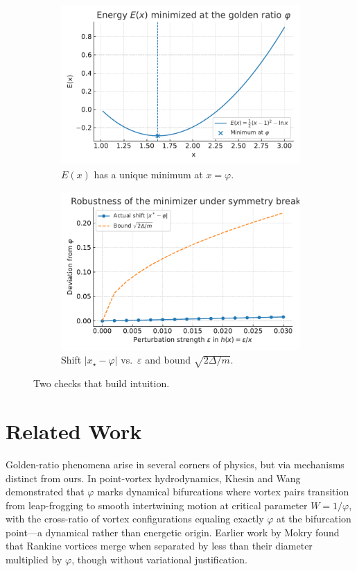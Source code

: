 \documentclass[11pt]{article}
\theoremstyle{remark}
\theoremstyle{definition}
\newcommand{\ph}{\varphi}
\newcommand{\eps}{\varepsilon}
\begin{document}
\begin{figure}[t]
  \centering
  \begin{subfigure}{0.48\linewidth}
    \centering
    \includegraphics[width=\linewidth]{E_of_x_min_at_phi.pdf}
    \caption{$E(x)$ has a unique minimum at $x=\ph$.}
  \end{subfigure}\hfill
  \begin{subfigure}{0.48\linewidth}
    \centering
    \includegraphics[width=\linewidth]{robustness_shift_vs_epsilon.pdf}
    \caption{Shift $|x_\star-\ph|$ vs.\ $\eps$ and bound $\sqrt{2\Delta/m}$.}
  \end{subfigure}
  \caption{Two checks that build intuition.}
\end{figure}

\FloatBarrier

\section{Related Work}
Golden-ratio phenomena arise in several corners of physics, but via mechanisms distinct from ours. In point-vortex hydrodynamics, Khesin and Wang \cite{khesin2021} demonstrated that $\ph$ marks dynamical bifurcations where vortex pairs transition from leap-frogging to smooth intertwining motion at critical parameter $W=1/\ph$, with the cross-ratio of vortex configurations equaling exactly $\ph$ at the bifurcation point---a dynamical rather than energetic origin. Earlier work by Mokry \cite{mokry2008} found that Rankine vortices merge when separated by less than their diameter multiplied by $\ph$, though without variational justification.
\end{document}
